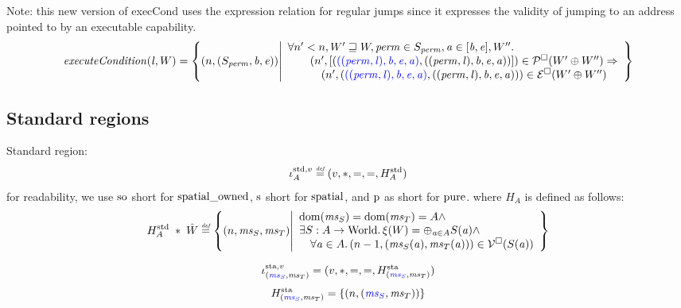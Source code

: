 \documentclass[a4paper]{article}
\begin{document}
Note: this new version of execCond uses the expression relation for regular jumps since it expresses the validity of jumping to an address pointed to by an executable capability. 
\[
  \execCond{\lin,W} = \left\{ \npair{(S_\perm,\baddr,\eaddr)} \middle|
    \begin{array}{l}
      \forall n' < n, W' \future W, \perm \in S_\perm, \aaddr \in [\baddr,\eaddr], W'' \ldotp\\
      \qquad \npair[n']{[\stpair[.]{((\perm,\lin),\baddr,\eaddr,\aaddr)}{((\perm,\lin),\baddr,\eaddr,\aaddr)}]} \in \lrp(W' \oplus W'') \Rightarrow \\
      \quad \qquad \npair[n']{\stpair[.]{((\perm,\lin),\baddr,\eaddr,\aaddr)}{((\perm,\lin),\baddr,\eaddr,\aaddr)}} \in \lre(W' \oplus W'')
    \end{array}
    \right\}
\]

\subsection{Standard regions}
\label{sec:standard-regions}
Standard region:
\[
  \stdreg{A}{v} \defeq (v,*,=,=,H_A^{\mathrm{std}})
\]
for readability, we use $\spao$ short for $\spatialo$, $\spa$ short for $\spatial$, and $\pur$ as short for $\pure$.
where $H_A$ is defined as follows:
\[
  H_A^{\mathrm{std}} \; * \; \hat{W} \defeq \left\{ \npair{\ms_S,\ms_T} \middle|
    \begin{array}{l}
      \dom(\ms_S) = \dom(\ms_T) = A \wedge \\
      \exists S : A \fun \World \ldotp \xi(W) = \oplus_{\aaddr \in A} S(\aaddr) \wedge\\
      \quad \forall \aaddr \in A \ldotp \npair[n-1]{(\ms_S(\aaddr),\ms_T(\aaddr))} \in \lrv(S(\aaddr))
    \end{array}
  \right\}
\]

\[
  \stareg{v} = (v,*,=,=,H^\mathrm{sta}_{\stpair{\ms}{\ms}})
\]
\[
  H^\mathrm{sta}_{\stpair{\ms}{\ms}} = \{ \npair{\stpair{\ms}{\ms}} \}
\]
\end{document}
